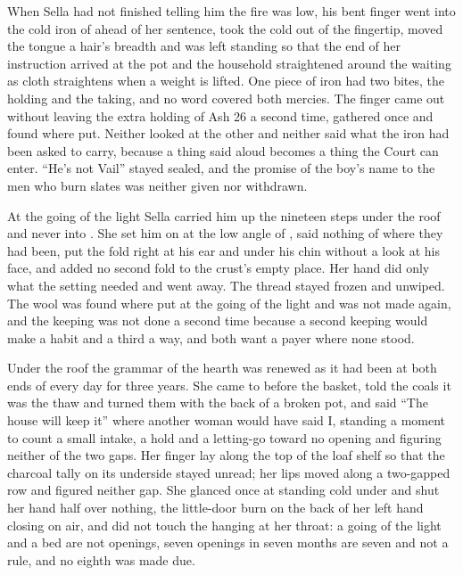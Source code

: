 When Sella had not finished telling him the fire was low, his bent finger went into the cold iron of  ahead of her sentence, took the cold out of the fingertip, moved the tongue a hair's breadth and was left standing so that the end of her instruction arrived at the pot and the household straightened around the waiting as cloth straightens when a weight is lifted. One piece of iron had two bites, the holding and the taking, and no  word covered both mercies. The finger came out without leaving the extra holding of Ash 26 a second time, gathered once and found where put. Neither looked at the other and neither said what the iron had been asked to carry, because a thing said aloud becomes a thing the Court can enter. “He's not Vail” stayed sealed, and the promise of the boy's name to the men who burn slates was neither given nor withdrawn.

\scenebreak

At the going of the light Sella carried him up the nineteen steps under the roof and never into . She set him on  at the low angle of , said nothing of where they had been, put the fold right at his ear and under his chin without a look at his face, and added no second fold to the crust's empty place. Her hand did only what the setting needed and went away. The thread stayed frozen and unwiped. The wool was found where put at the going of the light and was not made again, and the keeping was not done a second time because a second keeping would make a habit and a third a way, and both want a payer where none stood.

Under the roof the grammar of the hearth was renewed as it had been at both ends of every day for three years. She came to  before the basket, told the coals it was the thaw and turned them with the back of a broken pot, and said “The house will keep it” where another woman would have said I, standing a moment to count a small intake, a hold and a letting-go toward no opening and figuring neither of the two gaps. Her finger lay along the top of the loaf shelf so that the charcoal tally on its underside stayed unread; her lips moved along a two-gapped row and figured neither gap. She glanced once at  standing cold under  and shut her hand half over nothing, the little-door burn on the back of her left hand closing on air, and did not touch the  hanging at her throat: a going of the light and a bed are not openings, seven openings in seven months are seven and not a rule, and no eighth was made due.

